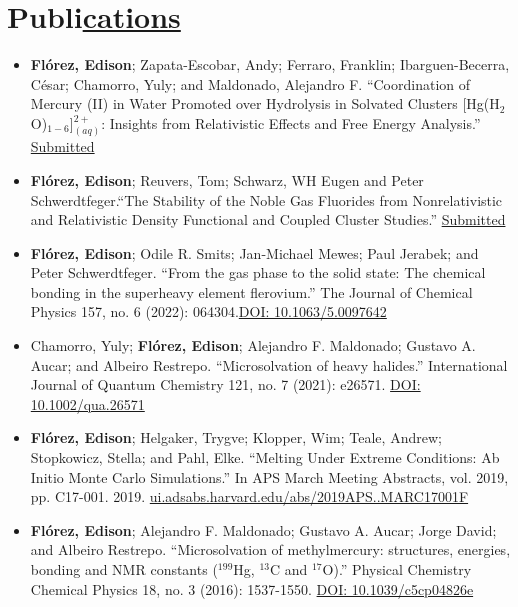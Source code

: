 \section{Publi\href{.}{cations}}

\begin{itemize}
    \small

    \item \textbf{Flórez, Edison}; Zapata-Escobar, Andy; Ferraro, Franklin; Ibarguen-Becerra, César; Chamorro, Yuly; and Maldonado, Alejandro F. ``Coordination of Mercury (II) in Water Promoted over Hydrolysis in Solvated Clusters [Hg(H$_2$O)$_{1-6}$]$^{2+}_{(aq)}$: Insights from Relativistic Effects and Free Energy Analysis.'' \href{.}{Submitted}

    \item \textbf{Flórez, Edison}; Reuvers, Tom; Schwarz, WH Eugen and Peter Schwerdtfeger.``The Stability of the Noble Gas Fluorides from Nonrelativistic and Relativistic Density Functional and Coupled Cluster Studies.'' \href{.}{Submitted}

    \item \textbf{Flórez, Edison}; Odile R. Smits; Jan-Michael Mewes; Paul Jerabek; and Peter Schwerdtfeger. ``From the gas phase to the solid state: The chemical bonding in the superheavy element flerovium.'' The Journal of Chemical Physics 157, no. 6 (2022): 064304.\href{https://www.doi.org/10.1063/5.0097642}{DOI: 10.1063/5.0097642}

    \item Chamorro, Yuly;  \textbf{Flórez, Edison}; Alejandro F. Maldonado; Gustavo A. Aucar; and Albeiro Restrepo. ``Microsolvation of heavy halides.'' International Journal of Quantum Chemistry 121, no. 7 (2021): e26571. \href{https://www.doi.org/10.1002/qua.26571}{DOI: 10.1002/qua.26571}

    \item \textbf{Flórez, Edison}; Helgaker, Trygve; Klopper, Wim; Teale, Andrew; Stopkowicz, Stella; and Pahl, Elke. ``Melting Under Extreme Conditions: Ab Initio Monte Carlo Simulations.'' In APS March Meeting Abstracts, vol. 2019, pp. C17-001. 2019. \href{https://ui.adsabs.harvard.edu/abs/2019APS..MARC17001F/abstract}{ui.adsabs.harvard.edu/abs/2019APS..MARC17001F}

    \item \textbf{Flórez, Edison}; Alejandro F. Maldonado; Gustavo A. Aucar; Jorge David; and Albeiro Restrepo. ``Microsolvation of methylmercury: structures, energies, bonding and NMR constants ($^{199}$Hg, $^{13}$C and $^{17}$O).'' Physical Chemistry Chemical Physics 18, no. 3 (2016): 1537-1550. \href{https://www.doi.org/10.1039/c5cp04826e}{DOI: 10.1039/c5cp04826e}

\end{itemize}


